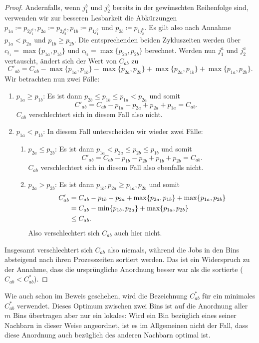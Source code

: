 \documentclass{scrreprt}
\begin{document}
\begin{proof}
    Andernfalls, wenn $j_1^b$ und $j_2^b$ bereits in der gewünschten Reihenfolge sind,
    verwenden wir zur besseren Lesbarkeit die Abkürzungen 
    $p_{1a}\coloneqq p_{2j_1^a}, p_{2a}\coloneqq p_{2j_2^a}, p_{1b}\coloneqq p_{1j_1^b}$ und $p_{2b}\coloneqq p_{1j_2^b}$.
    Es gilt also nach Annahme $p_{1a} < p_{2a}$ und $p_{1b}\geq p_{2b}$.
    Die entsprechenden beiden Zykluszeiten werden über $c_{t_1}=\max\{p_{1a},p_{1b}\}$ und $c_{t_2}=\max\{p_{2a},p_{2b}\}$ berechnet.
    Werden nun $j_1^a$ und $j_2^a$ vertauscht, ändert sich der Wert von $C_{ab}$ zu
    \[ C'_{ab} = C_{ab} - \max\{p_{1a},p_{1b}\} - \max\{p_{2a},p_{2b}\} + \max\{p_{2a},p_{1b}\} + \max\{p_{1a},p_{2b}\} \text{.}\]
    Wir betrachten nun zwei Fälle:
    \begin{enumerate}
        \item $p_{1a}\geq p_{1b}$: Es ist dann $p_{2b}\leq p_{1b}\leq p_{1a} < p_{2a}$ und somit
            \[ C'_{ab} = C_{ab} - p_{1a} - p_{2a} + p_{2a} + p_{1a} = C_{ab} \text{.} \]
            $C_{ab}$ verschlechtert sich in diesem Fall also nicht.
        \item $p_{1a} < p_{1b}$: In diesem Fall unterscheiden wir wieder zwei Fälle:
            \begin{enumerate}
                \item $p_{2a}\leq p_{2b}$: Es ist dann $p_{1a} < p_{2a}\leq p_{2b}\leq p_{1b}$ und somit
                    \[ C'_{ab} = C_{ab} - p_{1b} - p_{2b} + p_{1b} + p_{2b} = C_{ab} \text{.} \]
                    $C_{ab}$ verschlechtert sich in diesem Fall also ebenfalls nicht.
                \item $p_{2a} > p_{2b}$: Es ist dann $p_{1b},p_{2a} \geq p_{1a},p_{2b}$ und somit
                \begin{align}
                C'_{ab} &= C_{ab} - p_{1b} - p_{2a} + \max\{p_{2a},p_{1b}\} + \max\{p_{1a},p_{2b}\} \notag \\
                        &= C_{ab} - \min\{p_{1b},p_{2a}\} + \max\{p_{1a},p_{2b}\} \notag \\
                        &\leq C_{ab} \text{.} \notag
                \end{align}
                Also verschlechtert sich $C_{ab}$ auch hier nicht.
            \end{enumerate}
    \end{enumerate}
    Insgesamt verschlechtert sich $C_{ab}$ also niemals, während die Jobs in den Bins absteigend nach ihren Prozesszeiten sortiert werden.
    Das ist ein Widerspruch zu der Annahme, dass die ursprüngliche Anordnung besser war als die sortierte ($C_{ab} < C_{ab}^*$).
\end{proof}
Wie auch schon im Beweis geschehen, wird die Bezeichnung $C_{ab}^*$ für ein minimales $C_{ab}^*$ verwendet.
Dieses Optimum zwischen zwei Bins ist auf die Anordnung aller $m$ Bins übertragen aber nur ein lokales:
Wird ein Bin bezüglich eines seiner Nachbarn in dieser Weise angeordnet, ist es im Allgemeinen nicht der Fall,
dass diese Anordnung auch bezüglich des anderen Nachbarn optimal ist.
\end{document}
